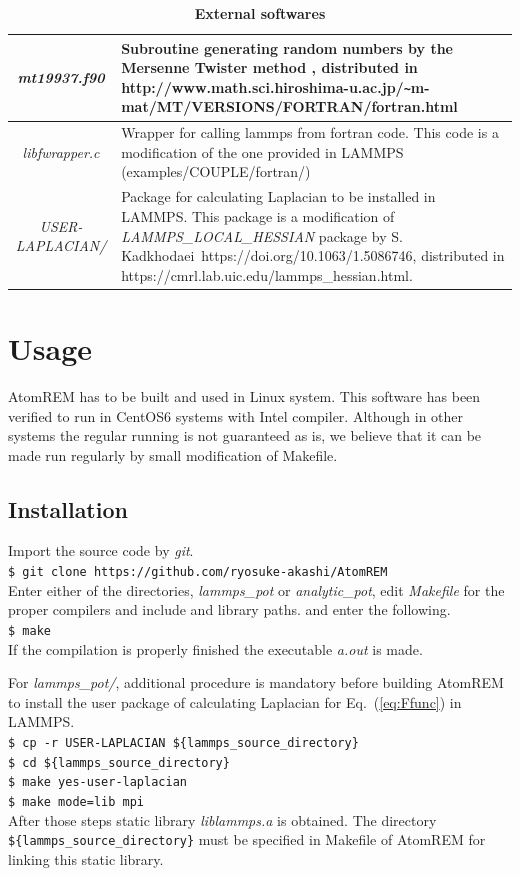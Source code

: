 \documentclass[preprint,12pt]{elsarticle}
\newcounter{bla}
\begin{document}
\begin{table}[!t]
\caption{\bf External softwares}
\begin{center}
\begin{tabular}{|c|p{10cm}|}
\hline
  {\it mt19937.f90} & Subroutine generating random numbers by the Mersenne Twister method \cite{MersenneTwister}, distributed in {\rm http://www.math.sci.hiroshima-u.ac.jp/\verb|~|m-mat/MT/VERSIONS/FORTRAN/fortran.html}
\\ \hline
 {\it libfwrapper.c} & Wrapper for calling lammps from fortran code. This code is a modification of the one provided in LAMMPS (examples/COUPLE/fortran/) 
 \\ \hline
 {\it USER-LAPLACIAN/} & Package for calculating Laplacian to be installed in LAMMPS. This package is a modification of {\it LAMMPS\_LOCAL\_HESSIAN} package by S. Kadkhodaei~https://doi.org/10.1063/1.5086746, 
 distributed in {\rm https://cmrl.lab.uic.edu/lammps\_hessian.html}.\\
\hline
\end{tabular}
\end{center}
\label{table:exter}
\end{table}

\section{Usage}
\label{sec:use}
AtomREM has to be built and used in Linux system. This software has been verified to run in CentOS6 systems with Intel compiler. Although in other systems the regular running is not guaranteed as is, we believe that it can be made run regularly by small modification of Makefile.
\subsection{Installation}
Import the source code by {\it git}.\\
{\tt \$ git clone https://github.com/ryosuke-akashi/AtomREM}\\
Enter either of the directories, {\it lammps\_pot} or {\it analytic\_pot}, edit {\it Makefile} for the proper compilers and include and library paths. and enter the following.\\
{\tt \$ make}\\
If the compilation is properly finished the executable {\it a.out} is made.

For {\it lammps\_pot/}, additional procedure is mandatory before building AtomREM to install the user package of calculating Laplacian for Eq.~(\ref{eq:Ffunc}) in LAMMPS.\\
{\tt \$ cp -r USER-LAPLACIAN {\color{blue}\$\{lammps\_source\_directory\}}}\\
{\tt \$ cd {\color{blue}\$\{lammps\_source\_directory\}}}\\
{\tt \$ make yes-user-laplacian}\\
{\tt \$ make mode=lib mpi}\\
After those steps static library {\it liblammps.a} is obtained. The directory \\ {\tt {\color{blue}\$\{lammps\_source\_directory\}}} must be specified in Makefile of AtomREM for linking this static library.
\end{document}
